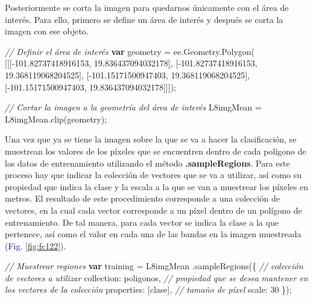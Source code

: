 \documentclass[
  12pt,
  letterpaper,
  twoside]{book}
\newenvironment{Shaded}{\begin{snugshade}}{\end{snugshade}}
\newcommand{\AttributeTok}[1]{\textcolor[rgb]{0.48,0.12,0.64}{#1}}
\newcommand{\CommentTok}[1]{\textcolor[rgb]{0.24,0.58,0.00}{\textit{#1}}}
\newcommand{\ControlFlowTok}[1]{\textcolor[rgb]{0.00,0.00,0.00}{\textbf{#1}}}
\newcommand{\DataTypeTok}[1]{\textcolor[rgb]{0.00,0.00,0.00}{#1}}
\newcommand{\DecValTok}[1]{\textcolor[rgb]{0.28,0.53,0.93}{#1}}
\newcommand{\FloatTok}[1]{\textcolor[rgb]{0.28,0.53,0.93}{#1}}
\newcommand{\FunctionTok}[1]{\textcolor[rgb]{0.48,0.12,0.64}{#1}}
\newcommand{\KeywordTok}[1]{\textcolor[rgb]{0.48,0.12,0.64}{#1}}
\newcommand{\NormalTok}[1]{#1}
\newcommand{\OperatorTok}[1]{\textcolor[rgb]{0.00,0.00,0.00}{#1}}
\newcommand{\StringTok}[1]{\textcolor[rgb]{0.87,0.29,0.22}{#1}}
\newcommand\boldpurple[1]{\textcolor{darkpurple}{\textbf{#1}}}
\begin{document}
Posteriormente se corta la imagen para quedarnos únicamente con el área de interés. Para ello, primero se define un área de interés y después se corta la imagen con ese objeto.

\begin{Shaded}
\begin{Highlighting}[]
\CommentTok{// Definir el área de interés}
\ControlFlowTok{var}\NormalTok{ geometry }\OperatorTok{=} \KeywordTok{ee}\OperatorTok{.}\AttributeTok{Geometry}\OperatorTok{.}\FunctionTok{Polygon}\NormalTok{(}
\NormalTok{        [[[}\OperatorTok{{-}}\FloatTok{101.82737418916153}\OperatorTok{,} \FloatTok{19.836437094032178}\NormalTok{]}\OperatorTok{,}
\NormalTok{          [}\OperatorTok{{-}}\FloatTok{101.82737418916153}\OperatorTok{,} \FloatTok{19.368119068204525}\NormalTok{]}\OperatorTok{,}
\NormalTok{          [}\OperatorTok{{-}}\FloatTok{101.15171500947403}\OperatorTok{,} \FloatTok{19.368119068204525}\NormalTok{]}\OperatorTok{,}
\NormalTok{          [}\OperatorTok{{-}}\FloatTok{101.15171500947403}\OperatorTok{,} \FloatTok{19.836437094032178}\NormalTok{]]])}\OperatorTok{;}
          
\CommentTok{// Cortar la imagen a la geometría del área de interés}
\NormalTok{L8imgMean }\OperatorTok{=}\NormalTok{ L8imgMean}\OperatorTok{.}\FunctionTok{clip}\NormalTok{(geometry)}\OperatorTok{;}
\end{Highlighting}
\end{Shaded}

Una vez que ya se tiene la imagen sobre la que se va a hacer la clasificación, se muestrean los valores de los píxeles que se encuentren dentro de cada polígono de los datos de entrenamiento utilizando el método \boldpurple{.sampleRegions}. Para este proceso hay que indicar la colección de vectores que se va a utilizar, así como su propiedad que indica la clase y la escala a la que se van a muestrear los píxeles en metros. El resultado de este procedimiento corresponde a una colección de vectores, en la cual cada vector corresponde a un píxel dentro de un polígono de entrenamiento. De tal manera, para cada vector se indica la clase a la que pertenece, así como el valor en cada una de las bandas en la imagen muestreada (\textcolor{darkblue}{Fig.} \ref{fig:fc122}).

\begin{Shaded}
\begin{Highlighting}[]
\CommentTok{// Muestrear regiones }
\ControlFlowTok{var}\NormalTok{ training }\OperatorTok{=}\NormalTok{ L8imgMean}
  \OperatorTok{.}\FunctionTok{sampleRegions}\NormalTok{(\{}
    \CommentTok{// colección de vectores a utilizar}
    \DataTypeTok{collection}\OperatorTok{:}\NormalTok{ poligonos}\OperatorTok{,}
    \CommentTok{// propiedad que se desea mantener en los vectores de la colección}
    \DataTypeTok{properties}\OperatorTok{:}\NormalTok{ [}\StringTok{\textquotesingle{}clase\textquotesingle{}}\NormalTok{]}\OperatorTok{,}
    \CommentTok{// tamaño de píxel}
    \DataTypeTok{scale}\OperatorTok{:} \DecValTok{30}
\NormalTok{  \})}\OperatorTok{;}
\end{Highlighting}
\end{Shaded}
\end{document}

